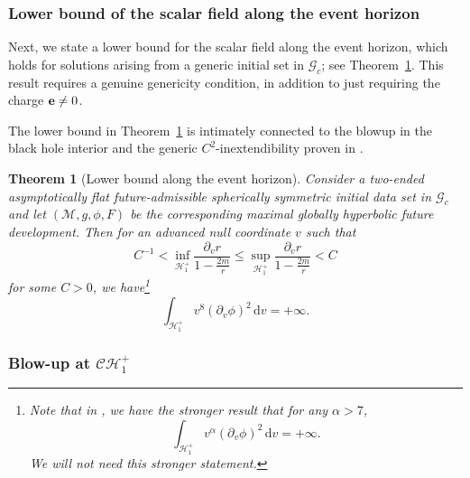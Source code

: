 \documentclass[10pt, reqno]{amsart}
\newtheorem{theorem}{Theorem}[section]
\theoremstyle{definition}
\theoremstyle{remark}
\numberwithin{equation}{section}
\newcommand{\ud}{\mathrm{d}}
\newcommand{\rd}{\partial}
\newcommand{\0}{\emptyset}
\newcommand{\alp}{\alpha}
\newcommand{\calC}{\mathcal C}
\newcommand{\calH}{\mathcal H}
\newcommand{\calM}{\mathcal M}
\newcommand{\CH}{\calC \calH^{+}}		%
\newcommand{\EH}{\calH^{+}}
\begin{document}
\subsubsection{Lower bound of the scalar field along the event horizon} Next, we state a lower bound for the scalar field along the event horizon, which holds for solutions arising from a generic initial set in $\mathcal G_c$; see Theorem~\ref{final.blow.up.step}. This result requires a genuine genericity condition, in addition to just requiring the charge ${\bf e} \neq 0$. 

The lower bound in Theorem~\ref{final.blow.up.step} is intimately connected to the blowup in the black hole interior and the generic $C^2$-inextendibility proven in \cite{LO.interior, LO.exterior}.

\begin{theorem}[Lower bound along the event horizon]\label{final.blow.up.step}
Consider a two-ended asymptotically flat future-admissible spherically symmetric initial data set in $\mathcal G_c$ and let $(\calM, g, \phi, F)$ be the corresponding maximal globally hyperbolic future development. 
Then for an advanced null coordinate $v$ such that
\begin{equation*}
	C^{-1} < \inf_{\EH_1} \frac{\rd_{v} r}{1-\frac{2m}{r}} \leq \sup_{\EH_1} \frac{\rd_{v} r}{1-\frac{2m}{r}} < C
\end{equation*}
for some $C > 0$, we have\footnote{Note that in \cite{LO.interior}, we have the stronger result that for any $\alp>7$,
$$\int_{\EH_1} v^{\alp} (\rd_{v} \phi)^{2} \, \ud v = +\infty.$$
We will not need this stronger statement.
}
\begin{equation}\label{eq:mass.inflation.lower.bd}
	\int_{\EH_1} v^{8} (\rd_{v} \phi)^{2} \, \ud v = +\infty.
\end{equation}
\end{theorem}


\subsubsection{Blow-up at $\CH_1$}\label{sec:CH.blowup.from.old.paper}
\end{document}
